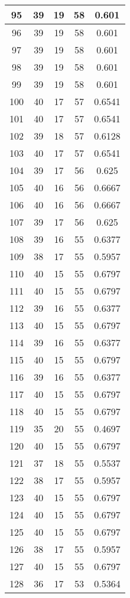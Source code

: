 \documentclass[letterpaper, 12pt]{article}
\begin{document}
\begin{longtable}{|c|c|c|c|c|}
\hline
95 & 39 & 19 & 58 & 0.601 \\
\hline
96 & 39 & 19 & 58 & 0.601 \\
\hline
97 & 39 & 19 & 58 & 0.601 \\
\hline
98 & 39 & 19 & 58 & 0.601 \\
\hline
99 & 39 & 19 & 58 & 0.601 \\
\hline
100 & 40 & 17 & 57 & 0.6541 \\
\hline
101 & 40 & 17 & 57 & 0.6541 \\
\hline
102 & 39 & 18 & 57 & 0.6128 \\
\hline
103 & 40 & 17 & 57 & 0.6541 \\
\hline
104 & 39 & 17 & 56 & 0.625 \\
\hline
105 & 40 & 16 & 56 & 0.6667 \\
\hline
106 & 40 & 16 & 56 & 0.6667 \\
\hline
107 & 39 & 17 & 56 & 0.625 \\
\hline
108 & 39 & 16 & 55 & 0.6377 \\
\hline
109 & 38 & 17 & 55 & 0.5957 \\
\hline
110 & 40 & 15 & 55 & 0.6797 \\
\hline
111 & 40 & 15 & 55 & 0.6797 \\
\hline
112 & 39 & 16 & 55 & 0.6377 \\
\hline
113 & 40 & 15 & 55 & 0.6797 \\
\hline
114 & 39 & 16 & 55 & 0.6377 \\
\hline
115 & 40 & 15 & 55 & 0.6797 \\
\hline
116 & 39 & 16 & 55 & 0.6377 \\
\hline
117 & 40 & 15 & 55 & 0.6797 \\
\hline
118 & 40 & 15 & 55 & 0.6797 \\
\hline
119 & 35 & 20 & 55 & 0.4697 \\
\hline
120 & 40 & 15 & 55 & 0.6797 \\
\hline
121 & 37 & 18 & 55 & 0.5537 \\
\hline
122 & 38 & 17 & 55 & 0.5957 \\
\hline
123 & 40 & 15 & 55 & 0.6797 \\
\hline
124 & 40 & 15 & 55 & 0.6797 \\
\hline
125 & 40 & 15 & 55 & 0.6797 \\
\hline
126 & 38 & 17 & 55 & 0.5957 \\
\hline
127 & 40 & 15 & 55 & 0.6797 \\
\hline
128 & 36 & 17 & 53 & 0.5364 \\

\end{longtable}
\end{document}
